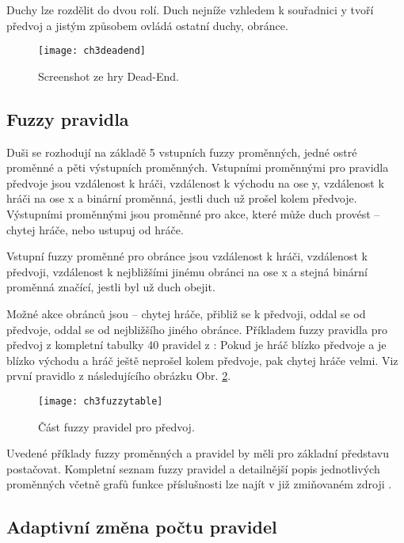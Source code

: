 Duchy lze rozdělit do dvou rolí. Duch nejníže vzhledem k souřadnici y tvoří předvoj a jistým způsobem ovládá ostatní duchy, obránce.

\begin{figure}
  \centering
  \texttt{[image: ch3deadend]}
	\caption{Screenshot ze hry Dead-End. \cite{25deadend} }
	\label{ch3deadend}
\end{figure}

\subsection{Fuzzy pravidla}

Duši se rozhodují na základě 5 vstupních fuzzy proměnných, jedné ostré proměnné a pěti výstupních proměnných.
Vstupními proměnnými pro pravidla předvoje jsou vzdálenost k hráči, vzdálenost k východu na ose y,  vzdálenost k hráči na ose x a binární proměnná, jestli duch už prošel kolem předvoje. Výstupními proměnnými jsou proměnné pro akce, které může duch provést – chytej hráče, nebo ustupuj od hráče.

Vstupní fuzzy proměnné pro obránce jsou vzdálenost k hráči, vzdálenost k předvoji, vzdálenost k nejbližšími jinému obránci na ose x a stejná binární proměnná značící, jestli byl už duch obejit.

Možné akce obránců jsou – chytej hráče, přibliž se k předvoji, oddal se od předvoje, oddal se od nejbližšího jiného obránce.
Příkladem fuzzy pravidla pro předvoj z kompletní tabulky 40 pravidel z \cite{25deadend} :
Pokud je hráč blízko předvoje a je blízko východu a hráč ještě neprošel kolem předvoje, pak chytej hráče velmi. Viz první pravidlo z následujícího obrázku Obr. \ref{fig-ch3fuzzytable}.

\begin{figure}
  \centering
  \texttt{[image: ch3fuzzytable]}
	\caption{Část fuzzy pravidel pro předvoj. \cite{25deadend} }
	\label{fig-ch3fuzzytable}
\end{figure}

Uvedené příklady fuzzy proměnných a pravidel by měli pro základní představu postačovat. Kompletní seznam fuzzy pravidel a detailnější popis jednotlivých proměnných včetně grafů funkce příslušnosti lze najít v již zmiňovaném zdroji \cite{25deadend}.

\subsection{Adaptivní změna počtu pravidel}

